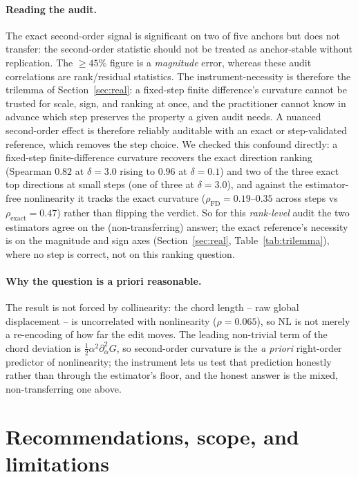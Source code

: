 \documentclass[10pt]{article}
\begin{document}
\paragraph{Reading the audit.} The exact second-order signal is significant on two of
five anchors but does not transfer:
the second-order statistic should not be treated as anchor-stable without replication. The
$\geq45\%$ figure is a \emph{magnitude} error, whereas these audit correlations are rank/residual statistics. The
instrument-necessity is therefore the trilemma of Section~\ref{sec:real}: a fixed-step finite
difference's curvature
cannot be trusted for scale, sign, and ranking at once, and the practitioner cannot know in advance which
step preserves the property a given audit needs. A nuanced second-order effect is
therefore reliably auditable with an exact or step-validated reference, which removes the step choice.
We checked this confound directly: a fixed-step finite-difference curvature recovers the exact
direction ranking (Spearman $0.82$ at $\delta=3.0$ rising to $0.96$ at $\delta=0.1$) and two of the
three exact top directions at small steps (one of three at $\delta=3.0$), and against the
estimator-free nonlinearity it tracks the exact curvature ($\rho_{\mathrm{FD}}=0.19$--$0.35$ across
steps vs $\rho_{\mathrm{exact}}=0.47$) rather than flipping the verdict. So for this \emph{rank-level}
audit the two estimators agree on the (non-transferring) answer; the exact reference's necessity is on
the magnitude and sign axes (Section~\ref{sec:real}, Table~\ref{tab:trilemma}), where no step is
correct, not on this ranking question.

\paragraph{Why the question is a priori reasonable.} The result is not forced by collinearity:
the chord length -- raw global displacement -- is uncorrelated with nonlinearity ($\rho=0.065$), so
$\mathrm{NL}$ is not merely a re-encoding of how far the edit moves. The leading non-trivial term of
the chord deviation is $\tfrac12\alpha^2\partial^2_\alpha G$, so second-order curvature is the
\emph{a priori} right-order predictor of nonlinearity; the instrument lets us test that prediction
honestly rather than through the estimator's floor, and the honest answer is the mixed,
non-transferring one above.

\section{Recommendations, scope, and limitations}
\label{sec:scope}
\end{document}
